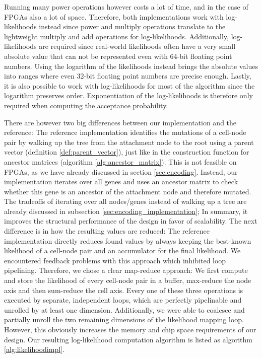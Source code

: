 Running many power operations however costs a lot of time, and in the case of \acp{FPGA} also a lot of space. Therefore, both implementations work with log-likelihoods instead since power and multiply operations translate to the lightweight multiply and add operations for log-likelihoods. Additionally, log-likelihoods are required since real-world likelihoods often have a very small absolute value that can not be represented even with 64-bit floating point numbers. Using the logarithm of the likelihoods instead brings the absolute values into ranges where even 32-bit floating point numbers are precise enough. Lastly, it is also possible to work with log-likelihoods for most of the algorithm since the logarithm preserves order. Exponentiation of the log-likelihoods is therefore only required when computing the acceptance probability.

There are however two big differences between our implementation and the reference: The reference implementation identifies the mutations of a cell-node pair by walking up the tree from the attachment node to the root using a parent vector (definition \ref{def:parent_vector}), just like in the construction function for ancestor matrices (algorithm \ref{alg:ancestor_matrix}). This is not feasible on \acp{FPGA}, as we have already discussed in section \ref{sec:encoding}. Instead, our implementation iterates over all genes and uses an ancestor matrix to check whether this gene is an ancestor of the attachment node and therefore mutated. The tradeoffs of iterating over all nodes/genes instead of walking up a tree are already discussed in subsection \ref{sec:encoding_implementation}; In summary, it improves the structural performance of the design in favor of scalability. The next difference is in how the resulting values are reduced: The reference implementation directly reduces found values by always keeping the best-known likelihood of a cell-node pair and an accumulator for the final likelihood. We encountered feedback problems with this approach which inhibited loop pipelining. Therefore, we chose a clear map-reduce approach: We first compute and store the likelihood of every cell-node pair in a buffer, max-reduce the node axis and then sum-reduce the cell axis. Every one of these three operations is executed by separate, independent loops, which are perfectly pipelinable and unrolled by at least one dimension. Additionally, we were able to coalesce and partially unroll the two remaining dimensions of the likelihood mapping loop. However, this obviously increases the memory and chip space requirements of our design. Our resulting log-likelihood computation algorithm is listed as algorithm \ref{alg:likelihoodimpl}.

